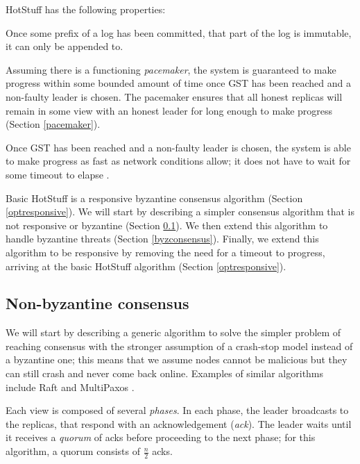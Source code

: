 HotStuff has the following properties:

\begin{property}[Safety] \label{safetyproperty}
	Once some prefix of a log has been committed, that part of the log is immutable, it can only be appended to.
\end{property}

\begin{property}[Liveness] \label{livenessproperty}
	Assuming there is a functioning \textit{pacemaker}, the system is guaranteed to make progress within some bounded amount of time once GST has been reached and a non-faulty leader is chosen. The pacemaker ensures that all honest replicas will remain in some view with an honest leader for long enough to make progress (Section \ref{pacemaker}).
\end{property}

\begin{property} \label{optresponsiveproperty}
	Once GST has been reached and a non-faulty leader is chosen, the system is able to make progress as fast as network conditions allow; it does not have to wait for some timeout to elapse \cite{passThunderellaBlockchainsOptimistic2018}.
\end{property}

Basic HotStuff is a responsive byzantine consensus algorithm (Section \ref{optresponsive}). We will start by describing a simpler consensus algorithm that is not responsive or byzantine (Section \ref{nonbyzconsensus}). We then extend this algorithm to handle byzantine threats (Section \ref{byzconsensus}). Finally, we extend this algorithm to be responsive by removing the need for a timeout to progress, arriving at the basic HotStuff algorithm (Section \ref{optresponsive}).

\subsection{Non-byzantine consensus} \label{nonbyzconsensus}
We will start by describing a generic algorithm to solve the simpler problem of reaching consensus with the stronger assumption of a crash-stop model instead of a byzantine one; this means that we assume nodes cannot be malicious but they can still crash and never come back online. Examples of similar algorithms include Raft \cite{ongaroSearchUnderstandableConsensus2014} and MultiPaxos \cite{lamportParttimeParliament1998, lamportPaxosMadeSimple2001}.

Each view is composed of several \textit{phases}. In each phase, the leader broadcasts to the replicas, that respond with an acknowledgement (\textit{ack}). The leader waits until it receives a \textit{quorum} of acks before proceeding to the next phase; for this algorithm, a quorum consists of $\frac{n}{2}$ acks.

